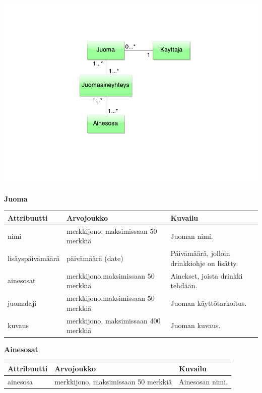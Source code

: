 \documentclass[a4paper]{article}
\begin{document}
\includegraphics[scale=0.8]{kasitekaavio.pdf}

\begin{flushleft}\textbf{Juoma} \end{flushleft}
\begin{flushleft}
	\begin{tabular}{|l|l|l|}\hline
			Attribuutti      & Arvojoukko        & Kuvailu\\
			\hline
			nimi & merkkijono, maksimissaan 50 merkkiä & Juoman nimi.\\ 
			\hline		
			lisäyspäivämäärä & päivämäärä (date) & Päivämäärä, jolloin drinkkiohje on lisätty.\\ 
			\hline
			ainesosat  & merkkijono,maksimissaan 50 merkkiä & Ainekset, joista drinkki tehdään. \\
			\hline
			juomalaji    & merkkijono,maksimissaan 50 merkkiä  & Juoman käyttötarkoitus. \\ 
			\hline
			kuvaus    & merkkijono, maksimissaan 400 merkkiä & Juoman kuvaus. \\ 
				\hline
	\end{tabular}
\end{flushleft}

\begin{flushleft}\textbf{Ainesosat} \end{flushleft}
\begin{flushleft}
	\begin{tabular}{|l|l|l|}
			\hline
			Attribuutti & Arvojoukko & Kuvailu \\ 
			\hline
			ainesosa & merkkijono, maksimissaan 50 merkkiä & Ainesosan nimi. \\ 
			\hline
	\end{tabular}
\end{flushleft}
\end{document}
